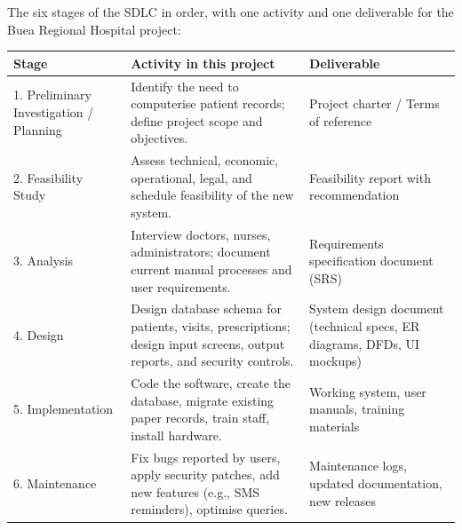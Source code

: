 \documentclass[11pt]{article}
\begin{document}
\begin{corrige}
The six stages of the SDLC in order, with one activity and one deliverable for the Buea Regional Hospital project:

\begin{center}
\begin{tabularx}{\linewidth}{|l|X|X|}
\hline
\rowcolor{popblueL}
\textbf{Stage} & \textbf{Activity in this project} & \textbf{Deliverable} \\
\hline
1. Preliminary Investigation / Planning & Identify the need to computerise patient records; define project scope and objectives. & Project charter / Terms of reference \\
\hline
2. Feasibility Study & Assess technical, economic, operational, legal, and schedule feasibility of the new system. & Feasibility report with recommendation \\
\hline
3. Analysis & Interview doctors, nurses, administrators; document current manual processes and user requirements. & Requirements specification document (SRS) \\
\hline
4. Design & Design database schema for patients, visits, prescriptions; design input screens, output reports, and security controls. & System design document (technical specs, ER diagrams, DFDs, UI mockups) \\
\hline
5. Implementation & Code the software, create the database, migrate existing paper records, train staff, install hardware. & Working system, user manuals, training materials \\
\hline
6. Maintenance & Fix bugs reported by users, apply security patches, add new features (e.g., SMS reminders), optimise queries. & Maintenance logs, updated documentation, new releases \\
\hline
\end{tabularx}
\end{center}
\end{corrige}
\end{document}
